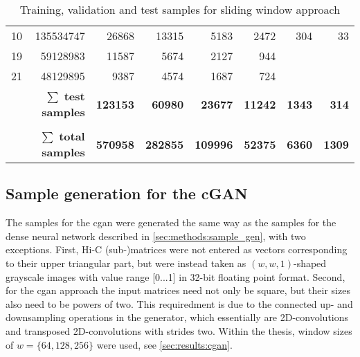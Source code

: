 \begin{table}[hbp]
\begin{tabular}{lrrrrrrr}
10                                                       & 135534747                                               & 26868                  & 13315                   & 5183                    & 2472                    & 304                      & 33                       \\
19                                                       & 59128983                                                & 11587                  & 5674                    & 2127                    & 944                     &                          &                          \\
21                                                       & 48129895                                                & 9387                   & 4574                    & 1687                    & 724                     &                          &                          \\
\multicolumn{2}{r}{$\mathbf{\sum}$ \textbf{test samples}}                                                                          & \textbf{123153}        & \textbf{60980}          & \textbf{23677}          & \textbf{11242}          & \textbf{1343}            & \textbf{314}             \\
                                                         &                                                         & \multicolumn{1}{l}{}   & \multicolumn{1}{l}{}    & \multicolumn{1}{l}{}    & \multicolumn{1}{l}{}    & \multicolumn{1}{l}{}     & \multicolumn{1}{l}{}     \\
\multicolumn{2}{r}{$\mathbf{\sum}$ \textbf{total samples}}                                                                         & \textbf{570958}        & \textbf{282855}         & \textbf{109996}         & \textbf{52375}          & \textbf{6360}            & \textbf{1309}            \\ \hline
\end{tabular}
\caption{Training, validation and test samples for sliding window approach} \label{tab:methods:samples}
\end{table}

\subsection{Sample generation for the cGAN} \label{sec:methods:sample_gen_cgan}
The samples for the \acrshort{cgan} were generated the same way as the samples for the dense neural network described 
in \cref{sec:methods:sample_gen}, with two exceptions.
First, Hi-C (sub-)matrices were not entered as vectors corresponding to their upper triangular part, 
but were instead taken as $(w, w, 1)$-shaped grayscale images with value range [0...1] in 32-bit floating point format.
Second, for the \acrshort{cgan} approach the input matrices need not only be square,
but their sizes also need to be powers of two. 
This requiredment is due to the connected up- and downsampling operations in the generator, 
which essentially are 2D-convolutions and transposed 2D-convolutions with strides two.
Within the thesis, window sizes of $w=\{64,128,256\}$ were used, see \cref{sec:results:cgan}.

